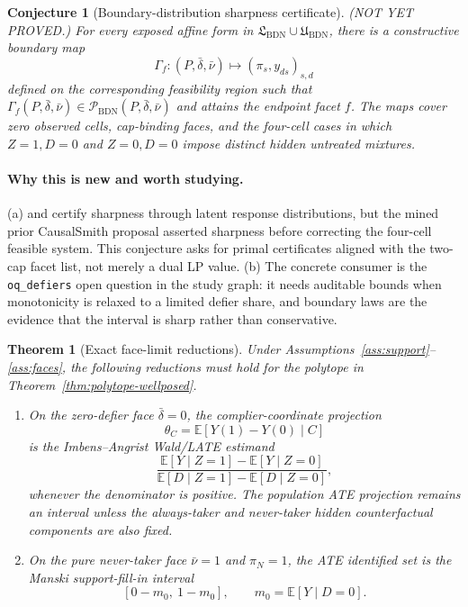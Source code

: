 \documentclass[11pt]{article}
\newcommand{\E}{\mathbb{E}}
\theoremstyle{definition}
\theoremstyle{plain}
\newtheorem{theorem}{Theorem}
\newtheorem{conjecture}{Conjecture}
\theoremstyle{remark}
\begin{document}
\begin{conjecture}[Boundary-distribution sharpness certificate]\label{conj:boundary-certificates}
(NOT YET PROVED.)  For every exposed affine form in
\(\mathfrak{L}_{\mathrm{BDN}}\cup\mathfrak{U}_{\mathrm{BDN}}\), there is a
constructive boundary map
\[
\Gamma_f:(P,\bar\delta,\bar\nu)\mapsto(\pi_s,y_{ds})_{s,d}
\]
defined on the corresponding feasibility region such that
\(\Gamma_f(P,\bar\delta,\bar\nu)\in
\mathcal{P}_{\mathrm{BDN}}(P,\bar\delta,\bar\nu)\) and attains the endpoint
facet \(f\).  The maps cover zero observed cells, cap-binding faces, and the
four-cell cases in which \(Z=1,D=0\) and \(Z=0,D=0\) impose distinct hidden
untreated mixtures.
\end{conjecture}
\paragraph{Why this is new and worth studying.}
(a) \citet{RichardsonRobins2010} and \citet{BalkePearl1997} certify sharpness
through latent response distributions, but the mined prior CausalSmith proposal
asserted sharpness before correcting the four-cell feasible system.  This
conjecture asks for primal certificates aligned with the two-cap facet list,
not merely a dual LP value.  (b) The concrete consumer is the
\texttt{oq\_defiers} open question in the study graph: it needs auditable
bounds when monotonicity is relaxed to a limited defier share, and boundary
laws are the evidence that the interval is sharp rather than conservative.

\begin{theorem}[Exact face-limit reductions]\label{thm:face-limits}
Under Assumptions~\ref{ass:support}--\ref{ass:faces}, the following reductions
must hold for the polytope in Theorem~\ref{thm:polytope-wellposed}.
\begin{enumerate}[label=(\roman*)]
\item On the zero-defier face \(\bar\delta=0\), the complier-coordinate
projection
\[
\theta_C=\E[Y(1)-Y(0)\mid C]
\]
is the Imbens--Angrist Wald/LATE estimand
\[
\frac{\E[Y\mid Z=1]-\E[Y\mid Z=0]}
     {\E[D\mid Z=1]-\E[D\mid Z=0]},
\]
whenever the denominator is positive.  The population ATE projection remains
an interval unless the always-taker and never-taker hidden counterfactual
components are also fixed.
\item On the pure never-taker face \(\bar\nu=1\) and \(\pi_N=1\), the ATE
identified set is the Manski support-fill-in interval
\[
[0-m_0,\ 1-m_0],
\qquad m_0=\E[Y\mid D=0].
\]
\end{enumerate}
\end{theorem}
\end{document}
